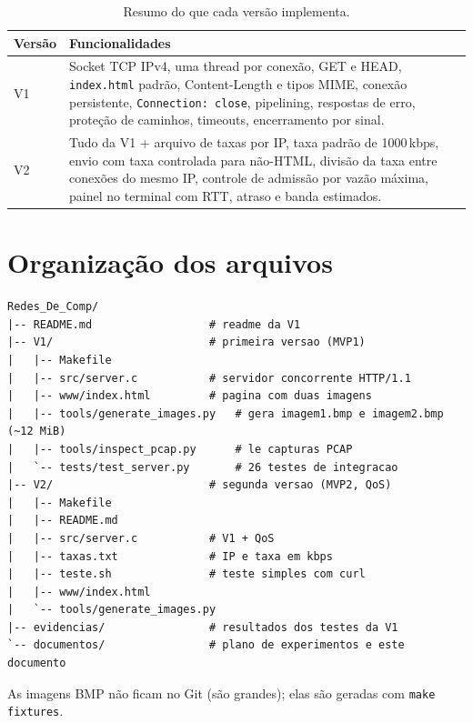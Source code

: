 \documentclass[11pt,a4paper]{article}
\begin{document}
\begin{table}[h]
\centering
\caption{Resumo do que cada versão implementa.}
\begin{tabularx}{\linewidth}{@{}lX@{}}
\toprule
\textbf{Versão} & \textbf{Funcionalidades} \\
\midrule
V1 & Socket TCP IPv4, uma thread por conexão, GET e HEAD, \texttt{index.html} padrão,
     Content-Length e tipos MIME, conexão persistente, \texttt{Connection: close},
     pipelining, respostas de erro, proteção de caminhos, timeouts, encerramento por sinal. \\
V2 & Tudo da V1 + arquivo de taxas por IP, taxa padrão de 1000\,kbps, envio com taxa
     controlada para não-HTML, divisão da taxa entre conexões do mesmo IP, controle de
     admissão por vazão máxima, painel no terminal com RTT, atraso e banda estimados. \\
\bottomrule
\end{tabularx}
\end{table}

\section{Organização dos arquivos}

\begin{lstlisting}
Redes_De_Comp/
|-- README.md                  # readme da V1
|-- V1/                        # primeira versao (MVP1)
|   |-- Makefile
|   |-- src/server.c           # servidor concorrente HTTP/1.1
|   |-- www/index.html         # pagina com duas imagens
|   |-- tools/generate_images.py   # gera imagem1.bmp e imagem2.bmp (~12 MiB)
|   |-- tools/inspect_pcap.py      # le capturas PCAP
|   `-- tests/test_server.py       # 26 testes de integracao
|-- V2/                        # segunda versao (MVP2, QoS)
|   |-- Makefile
|   |-- README.md
|   |-- src/server.c           # V1 + QoS
|   |-- taxas.txt              # IP e taxa em kbps
|   |-- teste.sh               # teste simples com curl
|   |-- www/index.html
|   `-- tools/generate_images.py
|-- evidencias/                # resultados dos testes da V1
`-- documentos/                # plano de experimentos e este documento
\end{lstlisting}

As imagens BMP não ficam no Git (são grandes); elas são geradas com \texttt{make fixtures}.

\end{document}
